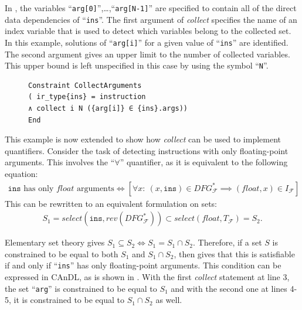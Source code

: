     \noindent
    In , the variables
    ``{\tt arg[0]}'',\dots,``{\tt arg[N-1]}''
    are specified to contain all of the direct data dependencies of
    ``{\tt ins}''.
    The first argument of {\it collect} specifies the name of an index
    variable that is used to detect which variables belong to the collected set.
    In this example, solutions of ``{\tt arg[i]}'' for a given value
    of ``{\tt ins}'' are identified.
    The second argument gives an upper limit to the number of collected
    variables.
    This upper bound is left unspecified in this case by using the symbol
    ``{\tt N}''.

\begin{figure}[t]
\begin{lstlisting}[language=CAnDL,label={fig:simplecollect},caption=
   {Simple {\it collect} example in CAnDL: Direct data dependencies of
    ``{\tt ins}'' are collected.\leftskip=0pt\rightskip=0pt}]
Constraint CollectArguments
( ir_type{ins} = instruction
∧ collect i N ({arg[i]} ∈ {ins}.args))
End
\end{lstlisting}
\end{figure}

    This example is now extended to show how {\it collect} can be used to
    implement quantifiers.
    Consider the task of detecting instructions with only floating-point
    arguments.
    This involves the ``$\forall$'' quantifier, as it is equivalent to
    the following equation:
    \begin{align}
        \texttt{ins}\text{ has only }\textit{float}\text{ arguments}\iff
        \left[\forall x\colon\ (x,\texttt{ins})\in DFG_\mathcal F^*\implies(\textit{float},x)\in I_\mathcal F\right]
        \label{fig:implication}
    \end{align}
    This can be rewritten to an equivalent formulation on sets:
    \begin{align*}
        S_1= \textit{select}(\texttt{ins},\textit{rev}(DFG_\mathcal F^*))\subset\textit{select}(\textit{float},T_\mathcal F)= S_2.
    \end{align*}
    
    Elementary set theory gives  $S_1\subseteq S_2\iff S_1 = S_1\cap S_2$.
    Therefore, if a set $S$ is constrained to be equal to both $S_1$ and
    $S_1\cap S_2$, then  gives that this is satisfiable if
    and only if ``{\tt ins}'' has only floating-point arguments.
    This condition can be expressed in CAnDL, as is shown in
    .
    With the first {\it collect} statement at line 3, the set ``{\tt arg}''
    is constrained to be equal to $S_1$ and with the second one at lines 4-5, it
    is constrained to be equal to $S_1\cap S_2$ as well.

